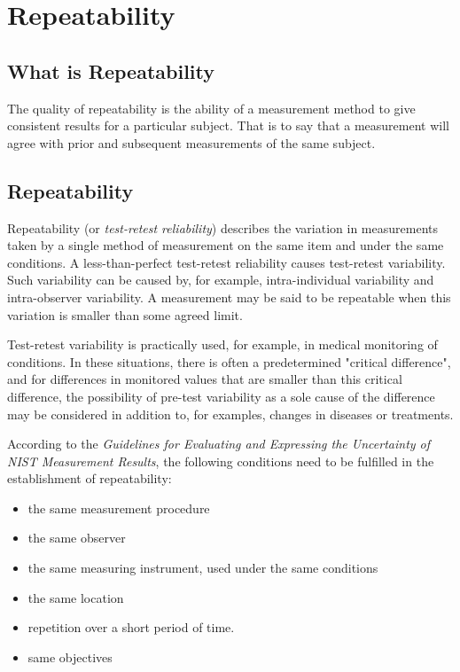 \documentclass[12pt, a4paper]{article}
\begin{document}
	
\section{Repeatability}
\subsection{What is Repeatability}
The quality of repeatability is the ability of a measurement method to give consistent results for a particular subject. That is to say that a measurement will agree with prior and subsequent measurements of the same subject.

\subsection{Repeatability}
Repeatability (or \textit{test-retest reliability})  describes the variation in measurements taken by a single method of measurement on the same item and under the same conditions. 
A less-than-perfect test-retest reliability causes test-retest variability. Such variability can be caused by, for example, intra-individual variability and intra-observer variability. 
A measurement may be said to be repeatable when this variation is smaller than some agreed limit.

Test-retest variability is practically used, for example, in medical monitoring of conditions. In these situations, there is often a predetermined "critical difference", and for differences in monitored values that are smaller than this critical difference, the possibility of pre-test variability as a sole cause of the difference may be considered in addition to, for examples, changes in diseases or treatments.

According to the \textit{Guidelines for Evaluating and Expressing the Uncertainty of NIST Measurement Results}, the following conditions need to be fulfilled in the establishment of repeatability:
\begin{itemize}
	\item	the same measurement procedure
	\item	the same observer
	\item	the same measuring instrument, used under the same conditions
	\item	the same location
	\item	repetition over a short period of time.
	\item  same objectives
\end{itemize}
\bigskip
\end{document}
